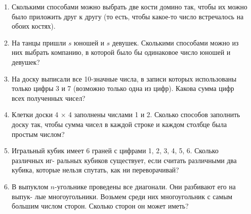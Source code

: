 \documentclass{article}
\begin{document}
\begin{enumerate}[label*=\protect\fbox{\arabic{enumi}}]
\item Сколькими способами можно выбрать две кости домино так, чтобы их можно было приложить друг к другу (то есть, чтобы какое-то число встречалось на обоих костях).

\item На танцы пришли $s$ юношей и $s$ девушек. Сколькими способами можно из них выбрать компанию, в которой было бы одинаковое число юношей и девушек?

\item На доску выписали все 10-значные числа, в записи которых использованы только цифры 3 и 7 (возможно только одна из цифр). Какова сумма цифр всех полученных чисел?
\item Клетки доски 4 × 4 заполнены числами 1 и 2. Сколько способов заполнить доску так, чтобы сумма чисел в каждой строке и каждом столбце была простым числом?
\item Игральный кубик имеет 6 граней с цифрами 1, 2, 3, 4, 5, 6. Сколько различных иг- ральных кубиков существует, если считать различными два кубика, которые нельзя спутать, как ни переворачивай?
\item В выпуклом $n$-угольнике проведены все диагонали. Они разбивают его на выпук- лые многоугольники. Возьмем среди них многоугольник с самым большим числом сторон. Сколько сторон он может иметь?


\end{enumerate}
\end{document}
